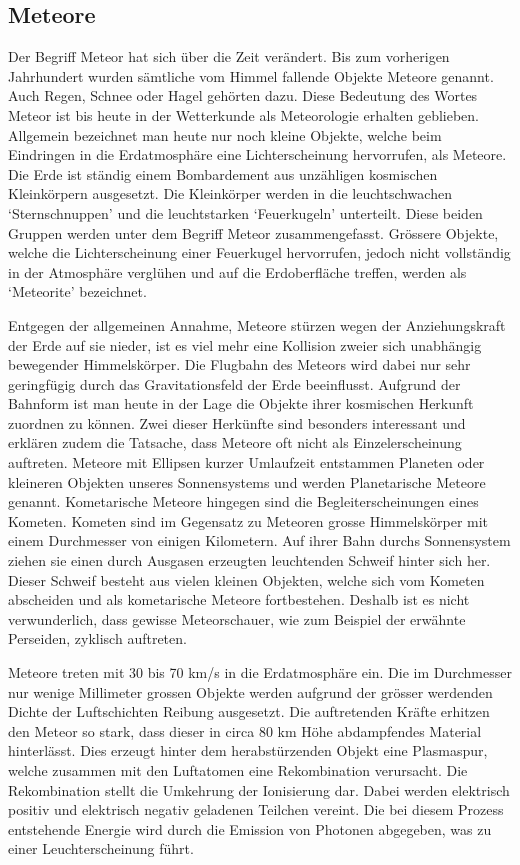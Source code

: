 \begin{refsection}
\section{Meteore}

Der Begriff Meteor hat sich über die Zeit verändert. 
Bis zum vorherigen Jahrhundert wurden sämtliche vom Himmel fallende Objekte Meteore genannt. 
Auch Regen, Schnee oder Hagel gehörten dazu. 
Diese Bedeutung des Wortes Meteor ist bis heute in der Wetterkunde als Meteorologie erhalten geblieben.
Allgemein bezeichnet man heute nur noch kleine Objekte, welche beim Eindringen in die Erdatmosphäre eine Lichterscheinung hervorrufen, als Meteore.  
Die Erde ist ständig einem Bombardement aus unzähligen kosmischen Kleinkörpern ausgesetzt. 
Die Kleinkörper werden in die leuchtschwachen `Sternschnuppen' und die leuchtstarken `Feuerkugeln' unterteilt.
Diese beiden Gruppen werden unter dem Begriff Meteor zusammengefasst.
Grössere Objekte, welche die Lichterscheinung einer Feuerkugel hervorrufen, jedoch nicht vollständig in der Atmosphäre verglühen und auf die Erdoberfläche treffen, werden als `Meteorite' bezeichnet.

Entgegen der allgemeinen Annahme, Meteore stürzen wegen der Anziehungskraft der Erde auf sie nieder, ist es viel mehr eine Kollision zweier sich unabhängig bewegender Himmelskörper. 
Die Flugbahn des Meteors wird dabei nur sehr geringfügig durch das Gravitationsfeld der Erde beeinflusst.
Aufgrund der Bahnform ist man heute in der Lage die Objekte ihrer kosmischen Herkunft zuordnen zu können. 
Zwei dieser Herkünfte sind besonders interessant und erklären zudem die Tatsache, dass Meteore oft nicht als Einzelerscheinung auftreten. 
Meteore mit Ellipsen kurzer Umlaufzeit entstammen Planeten oder kleineren Objekten unseres Sonnensystems und werden Planetarische Meteore genannt.
Kometarische Meteore hingegen sind die Begleiterscheinungen eines Kometen. 
Kometen sind im Gegensatz zu Meteoren grosse Himmelskörper mit einem Durchmesser von einigen Kilometern.
Auf ihrer Bahn durchs Sonnensystem ziehen sie einen durch Ausgasen erzeugten leuchtenden Schweif hinter sich her.
Dieser Schweif besteht aus vielen kleinen Objekten, welche sich vom Kometen abscheiden und als kometarische Meteore fortbestehen.
Deshalb ist es nicht verwunderlich, dass gewisse Meteorschauer, wie zum Beispiel der erwähnte Perseiden, zyklisch auftreten\cite{lexikon:meyer}.

Meteore treten mit 30 bis 70 km/s in die Erdatmosphäre ein. 
Die im Durchmesser nur wenige Millimeter grossen Objekte werden aufgrund der grösser werdenden Dichte der Luftschichten Reibung ausgesetzt.
Die auftretenden Kräfte erhitzen den Meteor so stark, dass dieser in circa 80 km Höhe abdampfendes Material hinterlässt.
Dies erzeugt hinter dem herabstürzenden Objekt eine Plasmaspur, welche zusammen mit den Luftatomen eine Rekombination verursacht.
Die Rekombination stellt die Umkehrung der Ionisierung dar. 
Dabei werden elektrisch positiv und elektrisch negativ geladenen Teilchen vereint.
Die bei diesem Prozess entstehende Energie wird durch die Emission von Photonen abgegeben, was zu einer Leuchterscheinung führt\cite{web:brodbeck}.


\end{refsection}
